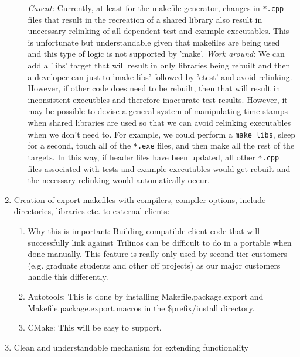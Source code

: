 \documentclass[pdf,ps2pdf,11pt]{SANDreport}
\begin{document}
\begin{enumerate}
\begin{enumerate}
  {}\textit{Caveat:} Currently, at least for the makefile generator,
  changes in {}\texttt{*.cpp} files that result in the recreation of a
  shared library also result in unecessary relinking of all dependent
  test and example executables.  This is unfortunate but
  understandable given that makefiles are being used and this type of
  logic is not supported by 'make'.  {}\textit{Work around}: We can
  add a 'libs' target that will result in only libraries being rebuilt
  and then a developer can just to 'make libs' followed by 'ctest' and
  avoid relinking.  However, if other code does need to be rebuilt,
  then that will result in inconsistent executbles and therefore
  inaccurate test results.  However, it may be possible to devise a
  general system of manipulating time stamps when shared libraries are
  used so that we can avoid relinking executables when we don't need
  to.  For example, we could perform a {}\texttt{make libs}, sleep for
  a second, touch all of the {}\texttt{*.exe} files, and then make all
  the rest of the targets.  In this way, if header files have been
  updated, all other {}\texttt{*.cpp} files associated with tests and
  example executables would get rebuilt and the necessary relinking
  would automatically occur.

  \end{enumerate}

{}\item Creation of export makefiles with compilers, compiler
options, include directories, libraries etc. to external clients:

  \begin{enumerate}

  {}\item Why this is important: Building compatible client code
  that will successfully link against Trilinos can be difficult to
  do in a portable when done manually.  This feature is really only used
  by second-tier customers (e.g. graduate students and other off
  projects) as our major customers handle this differently.

  {}\item Autotools: This is done by installing
  Makefile.package.export and Makefile.package.export.macros in the
  \$prefix/install directory.

  {}\item CMake: This will be easy to support.

  \end{enumerate}

{}\item Clean and understandable mechanism for extending
functionality


\end{enumerate}
\end{document}
